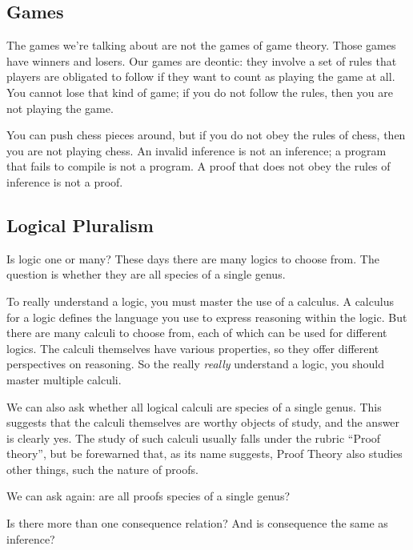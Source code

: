 \documentclass{article}
\begin{document}
\subsection{Games}

The games we're talking about are not the games of game theory. Those
games have winners and losers. Our games are deontic: they involve a
set of rules that players are obligated to follow if they want to
count as playing the game at all. You cannot lose that kind of game;
if you do not follow the rules, then you are not playing the game.

You can push chess pieces around, but if you do not obey the rules of
chess, then you are not playing chess. An invalid inference is not an
inference; a program that fails to compile is not a program. A proof
that does not obey the rules of inference is not a proof.

\subsection{Logical Pluralism}

Is logic one or many? These days there are many logics to choose from.
The question is whether they are all species of a single genus.

To really understand a logic, you must master the use of a calculus. A
calculus for a logic defines the language you use to express reasoning
within the logic. But there are many calculi to choose from, each of
which can be used for different logics. The calculi themselves have
various properties, so they offer different perspectives on reasoning.
So the really \textit{really} understand a logic, you should master
multiple calculi.

We can also ask whether all logical calculi are species of a single
genus. This suggests that the calculi themselves are worthy objects of
study, and the answer is clearly yes. The study of such calculi
usually falls under the rubric ``Proof theory'', but be forewarned
that, as its name suggests, Proof Theory also studies other things,
such the nature of proofs.

We can ask again: are all proofs species of a single genus?

Is there more than one consequence relation? And is consequence the
same as inference?
\end{document}
